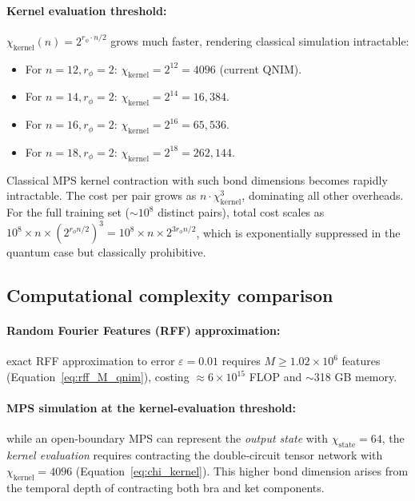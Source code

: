 \documentclass[11pt,a4paper, english]{book}
\theoremstyle{plain}
\theoremstyle{definition}
\numberwithin{equation}{chapter}
\numberwithin{figure}{chapter}
\numberwithin{table}{chapter}
\begin{document}
\paragraph{Kernel evaluation threshold:} $\chi_\mathrm{kernel}(n) = 2^{r_\phi \cdot n/2}$ grows much faster,
rendering classical simulation intractable:
\begin{itemize}
  \item For $n = 12, r_\phi = 2$: $\chi_\mathrm{kernel} = 2^{12} = 4096$ (current QNIM).
  \item For $n = 14, r_\phi = 2$: $\chi_\mathrm{kernel} = 2^{14} = 16{,}384$.
  \item For $n = 16, r_\phi = 2$: $\chi_\mathrm{kernel} = 2^{16} = 65{,}536$.
  \item For $n = 18, r_\phi = 2$: $\chi_\mathrm{kernel} = 2^{18} = 262{,}144$.
\end{itemize}

Classical MPS kernel contraction with such bond dimensions becomes rapidly intractable.
The cost per pair grows as $n \cdot \chi_\mathrm{kernel}^3$, dominating all other overheads.
For the full training set ($\sim 10^8$ distinct pairs), total cost scales as 
$10^8 \times n \times (2^{r_\phi n/2})^3 = 10^8 \times n \times 2^{3r_\phi n/2}$,
which is exponentially suppressed in the quantum case but classically prohibitive.

\subsection{Computational complexity comparison}

\paragraph{Random Fourier Features (RFF) approximation:}
exact RFF approximation to error $\varepsilon = 0.01$ requires $M \geq 1.02 \times 10^6$
features (Equation~\ref{eq:rff_M_qnim}), costing $\approx 6 \times 10^{15}$ FLOP and
$\sim$318 GB memory.

\paragraph{MPS simulation at the kernel-evaluation threshold:}
while an open-boundary MPS can represent the \emph{output state} with $\chi_\mathrm{state} = 64$,
the \emph{kernel evaluation} requires contracting the double-circuit tensor network with
$\chi_\mathrm{kernel} = 4096$ (Equation~\ref{eq:chi_kernel}). This higher bond dimension arises
from the temporal depth of contracting both bra and ket components.
\end{document}
